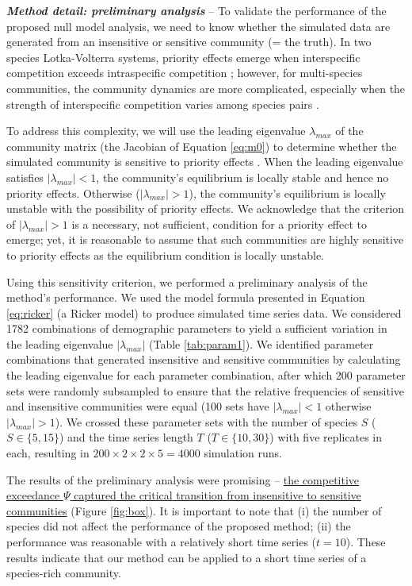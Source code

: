 \documentclass[12pt, class=article, crop=false]{standalone}
\begin{document}
\textbf{\textit{Method detail: preliminary analysis}} -- 
To validate the performance of the proposed null model analysis, we need to know whether the simulated data are generated from an insensitive or sensitive community (= the truth).
In two species Lotka-Volterra systems, priority effects emerge when interspecific competition exceeds intraspecific competition \citep{ke_coexistence_2018}; however, for multi-species communities, the community dynamics are more complicated, especially when the strength of interspecific competition varies among species pairs \citep{carroll_niche_2011, barabas_chessons_2018}.

To address this complexity, we will use the leading eigenvalue $\lambda_{max}$ of the community matrix (the Jacobian of Equation \ref{eq:m0}) to determine whether the simulated community is sensitive to priority effects \citep{otto_biologists_2011}.
When the leading eigenvalue satisfies $|\lambda_{max}| < 1$, the community's equilibrium is locally stable and hence no priority effects.
Otherwise ($|\lambda_{max}| > 1$), the community's equilibrium is locally unstable with the possibility of priority effects.
We acknowledge that the criterion of $|\lambda_{max}| > 1$ is a necessary, not sufficient, condition for a priority effect to emerge; yet, it is reasonable to assume that such communities are highly sensitive to priority effects as the equilibrium condition is locally unstable. 

Using this sensitivity criterion, we performed a preliminary analysis of the method's performance.
We used the model formula presented in Equation \ref{eq:ricker} (a Ricker model) to produce simulated time series data.
We considered 1782 combinations of demographic parameters to yield a sufficient variation in the leading eigenvalue $|\lambda_{max}|$ (Table \ref{tab:param1}).
We identified parameter combinations that generated insensitive and sensitive communities by calculating the leading eigenvalue for each parameter combination, after which 200 parameter sets were randomly subsampled to ensure that the relative frequencies of sensitive and insensitive communities were equal (100 sets have $|\lambda_{max}| < 1$ otherwise $|\lambda_{max}| > 1$).
We crossed these parameter sets with the number of species $S$ ($S \in \{5, 15\}$) and the time series length $T$ ($T \in \{10, 30\}$) with five replicates in each, resulting in $200 \times 2 \times 2 \times 5 = 4000$ simulation runs.

The results of the preliminary analysis were promising -- \ul{the competitive exceedance $\Psi$ captured the critical transition from insensitive to sensitive communities} (Figure \ref{fig:box}). It is important to note that (i) the number of species did not affect the performance of the proposed method; (ii) the performance was reasonable with a relatively short time series ($t = 10$).
These results indicate that our method can be applied to a short time series of a species-rich community. 
\end{document}
